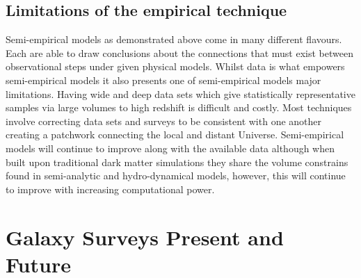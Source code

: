 \subsection{Limitations of the empirical technique}
Semi-empirical models as demonstrated above come in many different flavours. Each are able to draw conclusions about the connections that must exist between observational steps under given physical models. Whilst data is what empowers semi-empirical models it also presents one of semi-empirical models major limitations. Having wide and deep data sets which give statistically representative samples via large volumes to high redshift is difficult and costly. Most techniques involve correcting data sets and surveys to be consistent with one another creating a patchwork connecting the local and distant Universe. Semi-empirical models will continue to improve along with the available data although when built upon traditional dark matter simulations they share the volume constrains found in semi-analytic and hydro-dynamical models, however, this will continue to improve with increasing computational power.


\section{Galaxy Surveys Present and Future}
\label{sec:Surveys}





